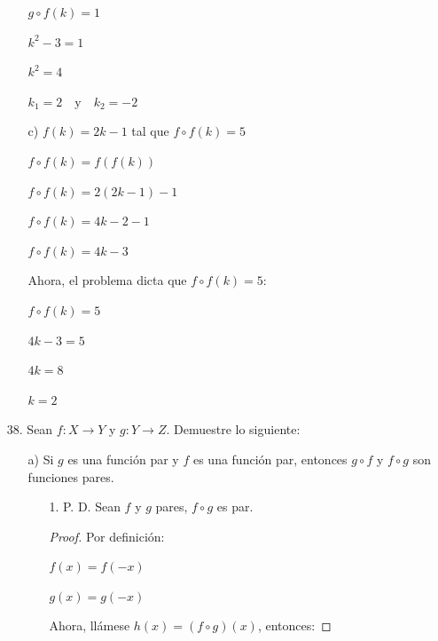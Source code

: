 \documentclass{article}
\begin{document}
\begin{enumerate}
\begin{enumerate}
        \(g \circ f(k) = 1\)
        
        \(k^2 - 3 = 1\)
        
        \(k^2 = 4\)
        
        \(k_1 = 2 \quad \text{y} \quad k_2 = -2\)
        \vspace{\baselineskip}
        
        \item[c)] \(f(k) = 2k - 1\) tal que \(f \circ f(k) = 5\)

        \(f \circ f(k) = f(f(k))\)
        
        \(f \circ f(k) = 2(2k - 1) - 1\)
        
        \(f \circ f(k) = 4k - 2 - 1\)
        
        \(f \circ f(k) = 4k - 3\)
        \vspace{\baselineskip}

        Ahora, el problema dicta que \(f \circ f(k) = 5\):
        
        \(f \circ f(k) = 5\)
        
        \(4k - 3 = 5\)
        
        \(4k = 8\)
        
        \(k = 2\)
    \end{enumerate}
    \vspace{\baselineskip}
    
\item[38.] Sean \(f: X \rightarrow Y\) y \(g: Y \rightarrow Z\). Demuestre lo siguiente:
    \begin{enumerate}
        \item[a)] Si \(g\) es una función par y \(f\) es una función par, entonces \(g \circ f\) y \(f \circ g\) son funciones pares.
        \begin{enumerate}
            \item[1.] P. D. Sean \(f\) y \(g\) pares, \(f \circ g\) es par.
            
            \begin{proof} Por definición:
            
            \(f(x) = f(-x)\)
            
            \(g(x) = g(-x)\)
            
            \vspace{\baselineskip}
            
            Ahora, llámese \(h(x) = (f \circ g)(x)\), entonces:
            

\end{proof}
\end{enumerate}
\end{enumerate}
\end{enumerate}
\end{document}
